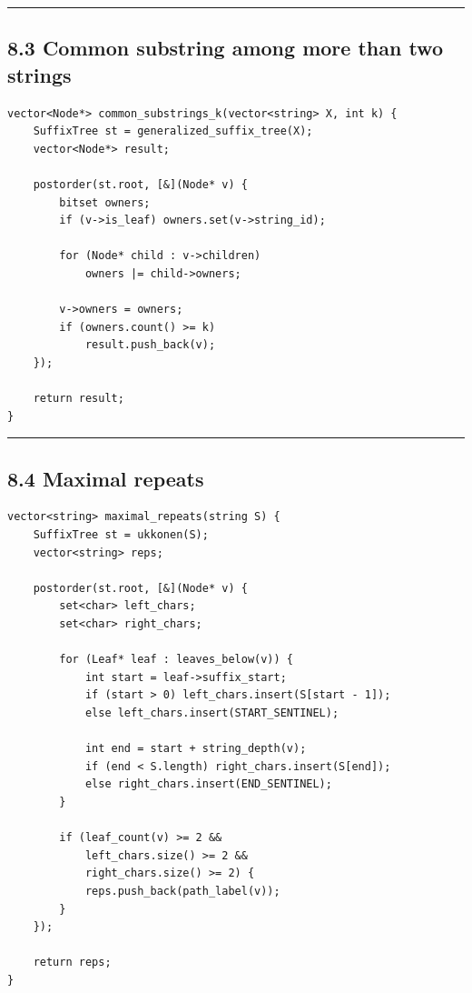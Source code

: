 \documentclass[11pt]{article}
\begin{document}
\begin{center}\rule{0.5\linewidth}{0.5pt}\end{center}

\subsection{8.3 Common substring among more than two strings}\label{common-substring-among-more-than-two-strings}

\begin{verbatim}
vector<Node*> common_substrings_k(vector<string> X, int k) {
    SuffixTree st = generalized_suffix_tree(X);
    vector<Node*> result;

    postorder(st.root, [&](Node* v) {
        bitset owners;
        if (v->is_leaf) owners.set(v->string_id);

        for (Node* child : v->children)
            owners |= child->owners;

        v->owners = owners;
        if (owners.count() >= k)
            result.push_back(v);
    });

    return result;
}
\end{verbatim}

\begin{center}\rule{0.5\linewidth}{0.5pt}\end{center}

\subsection{8.4 Maximal repeats}\label{maximal-repeats}

\begin{verbatim}
vector<string> maximal_repeats(string S) {
    SuffixTree st = ukkonen(S);
    vector<string> reps;

    postorder(st.root, [&](Node* v) {
        set<char> left_chars;
        set<char> right_chars;

        for (Leaf* leaf : leaves_below(v)) {
            int start = leaf->suffix_start;
            if (start > 0) left_chars.insert(S[start - 1]);
            else left_chars.insert(START_SENTINEL);

            int end = start + string_depth(v);
            if (end < S.length) right_chars.insert(S[end]);
            else right_chars.insert(END_SENTINEL);
        }

        if (leaf_count(v) >= 2 &&
            left_chars.size() >= 2 &&
            right_chars.size() >= 2) {
            reps.push_back(path_label(v));
        }
    });

    return reps;
}
\end{verbatim}
\end{document}
